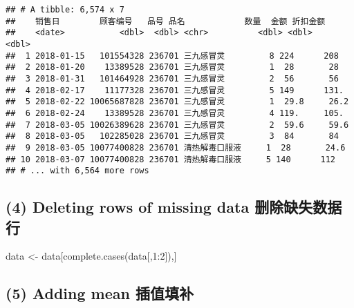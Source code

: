\documentclass[
]{article}
\newenvironment{Shaded}{\begin{snugshade}}{\end{snugshade}}
\newcommand{\AttributeTok}[1]{\textcolor[rgb]{0.77,0.63,0.00}{#1}}
\newcommand{\ConstantTok}[1]{\textcolor[rgb]{0.00,0.00,0.00}{#1}}
\newcommand{\DecValTok}[1]{\textcolor[rgb]{0.00,0.00,0.81}{#1}}
\newcommand{\FunctionTok}[1]{\textcolor[rgb]{0.00,0.00,0.00}{#1}}
\newcommand{\NormalTok}[1]{#1}
\newcommand{\OtherTok}[1]{\textcolor[rgb]{0.56,0.35,0.01}{#1}}
\newcommand{\SpecialCharTok}[1]{\textcolor[rgb]{0.00,0.00,0.00}{#1}}
\begin{document}
\begin{verbatim}
## # A tibble: 6,574 x 7
##    销售日        顾客编号   品号 品名            数量  金额 折扣金额
##    <date>           <dbl>  <dbl> <chr>          <dbl> <dbl>    <dbl>
##  1 2018-01-15   101554328 236701 三九感冒灵         8 224      208  
##  2 2018-01-20    13389528 236701 三九感冒灵         1  28       28  
##  3 2018-01-31   101464928 236701 三九感冒灵         2  56       56  
##  4 2018-02-17    11177328 236701 三九感冒灵         5 149      131. 
##  5 2018-02-22 10065687828 236701 三九感冒灵         1  29.8     26.2
##  6 2018-02-24    13389528 236701 三九感冒灵         4 119.     105. 
##  7 2018-03-05 10026389628 236701 三九感冒灵         2  59.6     59.6
##  8 2018-03-05   102285028 236701 三九感冒灵         3  84       84  
##  9 2018-03-05 10077400828 236701 清热解毒口服液     1  28       24.6
## 10 2018-03-07 10077400828 236701 清热解毒口服液     5 140      112  
## # ... with 6,564 more rows
\end{verbatim}

\hypertarget{deleting-rows-of-missing-data-ux5220ux9664ux7f3aux5931ux6570ux636eux884c}{%
\subsection{(4) Deleting rows of missing data
删除缺失数据行}\label{deleting-rows-of-missing-data-ux5220ux9664ux7f3aux5931ux6570ux636eux884c}}

\begin{Shaded}
\begin{Highlighting}[]
\NormalTok{data }\OtherTok{\textless{}{-}}\NormalTok{ data[}\FunctionTok{complete.cases}\NormalTok{(data[,}\DecValTok{1}\SpecialCharTok{:}\DecValTok{2}\NormalTok{]),]}
\end{Highlighting}
\end{Shaded}

\hypertarget{adding-mean-ux63d2ux503cux586bux8865}{%
\subsection{(5) Adding mean
插值填补}\label{adding-mean-ux63d2ux503cux586bux8865}}

\begin{Shaded}
\end{Shaded}
\end{document}
